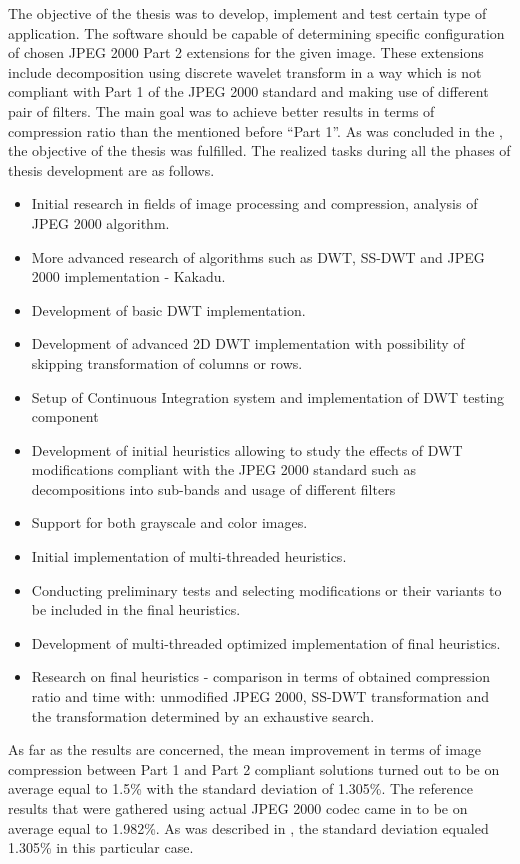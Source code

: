 The objective of the thesis was to develop, implement and test certain type of application. The software
should be capable of determining specific configuration of chosen JPEG 2000 Part 2 extensions for
the given image. These extensions include decomposition using discrete wavelet transform in a way
which is not compliant with Part 1 of the JPEG 2000 standard and making use of different pair of filters.
The main goal was to achieve better results in terms of compression ratio than the mentioned before
``Part 1''. As was concluded in the , the objective of the thesis was fulfilled.
The realized tasks during all the phases of thesis development are as follows.
\begin{itemize}
    \item Initial research in fields of image processing and compression, analysis of JPEG 2000 algorithm. 
    \item More advanced research of algorithms such as DWT, SS-DWT and JPEG 2000 implementation - Kakadu.
    \item Development of basic DWT implementation.
    \item Development of advanced 2D DWT implementation with possibility of skipping transformation of columns or rows.
    \item Setup of Continuous Integration system and implementation of DWT testing component 
    \item Development of initial heuristics allowing to study the effects of DWT modifications compliant
    with the JPEG 2000 standard such as decompositions into sub-bands and usage of different filters
    \item Support for both grayscale and color images.
    \item Initial implementation of multi-threaded heuristics.
    \item Conducting preliminary tests and selecting modifications or their variants to be included in the final heuristics.
    \item Development of multi-threaded optimized implementation of final heuristics.
    \item Research on final heuristics - comparison in terms of obtained compression ratio and time with: unmodified JPEG 2000,
    SS-DWT transformation and the transformation determined by an exhaustive search.
\end{itemize}

As far as the results are concerned, the mean improvement in terms of image compression between
Part 1 and Part 2 compliant solutions turned out to be on average equal to 1.5\% with the
standard deviation of 1.305\%. The reference results that were gathered using actual JPEG 2000
codec came in to be on average equal to 1.982\%. As was described in ,
the standard deviation equaled 1.305\% in this particular case.

